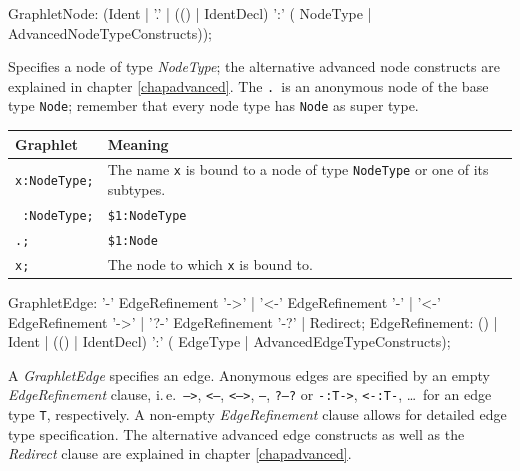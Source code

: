 \begin{rail}
GraphletNode: (Ident |
    '.' |
    (() | IdentDecl) ':' ( NodeType | AdvancedNodeTypeConstructs));
\end{rail}
Specifies a node of type \emph{NodeType}; the alternative advanced node constructs are explained in chapter \ref{chapadvanced}.
The \texttt{.}\ is an anonymous node of the base type \texttt{Node}; remember that every node type has \texttt{Node} as super type.

\begin{center}
  \begin{tabularx}{\linewidth}{lX}
    \textbf{Graphlet} & \textbf{Meaning}\\ \hline
    \texttt{x:NodeType;} & The name \texttt{x} is bound to a node of type \texttt{NodeType} or one of its subtypes. \\
    \texttt{ :NodeType;} & \texttt{\$1:NodeType} \\
    \texttt{.;} & \texttt{\$1:Node} \\
    \texttt{x;} & The node to which \texttt{x} is bound to.
  \end{tabularx}
\end{center}

\begin{rail}
  GraphletEdge: '-' EdgeRefinement '->'  | '<-' EdgeRefinement '-'  | '<-' EdgeRefinement '->' | '?-' EdgeRefinement '-?' | Redirect;
  EdgeRefinement: () | Ident | (() | IdentDecl) ':' ( EdgeType | AdvancedEdgeTypeConstructs);
\end{rail}
A \emph{GraphletEdge} specifies an edge.
Anonymous edges are specified by an empty \emph{EdgeRefinement} clause, i.\,e.\ \texttt{-->}, \texttt{<--}, \texttt{<-->}, \texttt{--}, \texttt{?--?} or \texttt{-:T->}, \texttt{<-:T-}, \dots\ for an edge type \texttt{T}, respectively.
A non-empty \emph{EdgeRefinement} clause allows for detailed edge type specification.
The alternative advanced edge constructs as well as the \emph{Redirect} clause are explained in chapter \ref{chapadvanced}.

